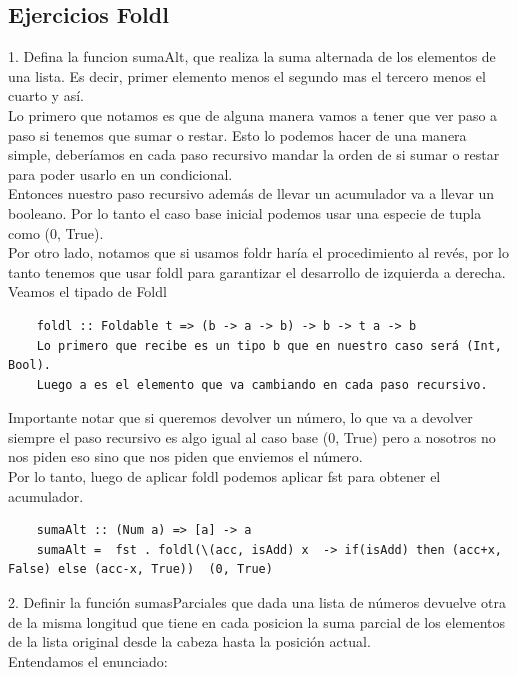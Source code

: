 \documentclass[10pt,a4paper]{article}
\begin{document}
\subsection*{Ejercicios Foldl}
\label{subsec:foldl_ejercicios}
1. Defina la funcion sumaAlt, que realiza la suma alternada de los elementos de una lista. Es decir, primer elemento menos el segundo mas el tercero menos el cuarto y así. \\
Lo primero que notamos es que de alguna manera vamos a tener que ver paso a paso si tenemos que sumar o restar. Esto lo podemos hacer de una manera simple, deberíamos en cada paso recursivo mandar la orden de si sumar o restar para poder usarlo en un condicional. \\
Entonces nuestro paso recursivo además de llevar un acumulador va a llevar un booleano. Por lo tanto el caso base inicial podemos usar una especie de tupla como (0, True). \\
Por otro lado, notamos que si usamos foldr haría el procedimiento al revés, por lo tanto tenemos que usar foldl para garantizar el desarrollo de izquierda a derecha. \\
Veamos el tipado de Foldl 
\begin{lstlisting}
    foldl :: Foldable t => (b -> a -> b) -> b -> t a -> b
    Lo primero que recibe es un tipo b que en nuestro caso será (Int, Bool).
    Luego a es el elemento que va cambiando en cada paso recursivo.
\end{lstlisting}
Importante notar que si queremos devolver un número, lo que va a devolver siempre el paso recursivo es algo igual al caso base (0, True) pero a nosotros no nos piden eso sino que nos piden que enviemos el número. \\
Por lo tanto, luego de aplicar foldl podemos aplicar fst para obtener el acumulador.
\begin{lstlisting}
    sumaAlt :: (Num a) => [a] -> a
    sumaAlt =  fst . foldl(\(acc, isAdd) x  -> if(isAdd) then (acc+x, False) else (acc-x, True))  (0, True)
\end{lstlisting}
2. Definir la función sumasParciales que dada una lista de números devuelve otra de la misma longitud que tiene en cada posicion la suma parcial de los elementos de la lista original desde la cabeza hasta la posición actual. \\
Entendamos el enunciado: 
\end{document}
